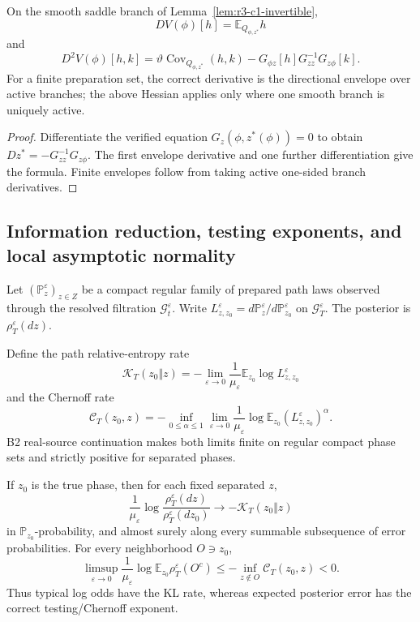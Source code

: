 \begin{theorem}
\label{thm:r3-c1-schur}
On the smooth saddle branch of
Lemma~\ref{lem:r3-c1-invertible},
\[
 DV(\phi)[h]=\mathbb E_{Q_{\phi,z^*}}h
\]
and
\[
 D^2V(\phi)[h,k]
 =\vartheta\operatorname{Cov}_{Q_{\phi,z^*}}(h,k)
 -G_{\phi z}[h]G_{zz}^{-1}G_{z\phi}[k].
\]
For a finite preparation set, the correct derivative is the directional
envelope over active branches; the above Hessian applies only where one smooth
branch is uniquely active.
\end{theorem}

\begin{proof}
Differentiate the verified equation
\(G_z(\phi,z^*(\phi))=0\) to obtain
\(Dz^*=-G_{zz}^{-1}G_{z\phi}\).  The first envelope derivative and one further
differentiation give the formula.  Finite envelopes follow from taking active
one-sided branch derivatives.
\end{proof}

\subsection{Information reduction, testing exponents, and local asymptotic normality}

Let \((\mathbb P_z^\varepsilon)_{z\in Z}\) be a compact regular family of
prepared path laws observed through the resolved filtration
\(\mathcal G_t^\varepsilon\).  Write
\(L_{z,z_0}^\varepsilon=d\mathbb P_z^\varepsilon/
 d\mathbb P_{z_0}^\varepsilon\) on \(\mathcal G_T^\varepsilon\).  The
posterior is \(\rho_T^\varepsilon(dz)\).

Define the path relative-entropy rate
\[
 \mathcal K_T(z_0\Vert z)
 =-\lim_{\varepsilon\to0}
 \frac1{\mu_\varepsilon}
 \mathbb E_{z_0}\log L_{z,z_0}^\varepsilon
\]
and the Chernoff rate
\[
 \mathcal C_T(z_0,z)
 =-\inf_{0\le\alpha\le1}
 \lim_{\varepsilon\to0}
 \frac1{\mu_\varepsilon}
 \log\mathbb E_{z_0}
 (L_{z,z_0}^\varepsilon)^\alpha.
\]
B2 real-source continuation makes both limits finite on regular compact phase
sets and strictly positive for separated phases.

\begin{theorem}
\label{thm:r3-c1-filter}
If \(z_0\) is the true phase, then for each fixed separated \(z\),
\[
 \frac1{\mu_\varepsilon}
 \log\frac{\rho_T^\varepsilon(dz)}
 {\rho_T^\varepsilon(dz_0)}
 \longrightarrow-\mathcal K_T(z_0\Vert z)
\]
in \(\mathbb P_{z_0}\)-probability, and almost surely along every summable
subsequence of error probabilities.  For every neighborhood \(O\ni z_0\),
\[
 \limsup_{\varepsilon\to0}
 \frac1{\mu_\varepsilon}
 \log\mathbb E_{z_0}\rho_T^\varepsilon(O^c)
 \le-\inf_{z\notin O}\mathcal C_T(z_0,z)<0.
\]
Thus typical log odds have the KL rate, whereas expected posterior error has
the correct testing/Chernoff exponent.
\end{theorem}

